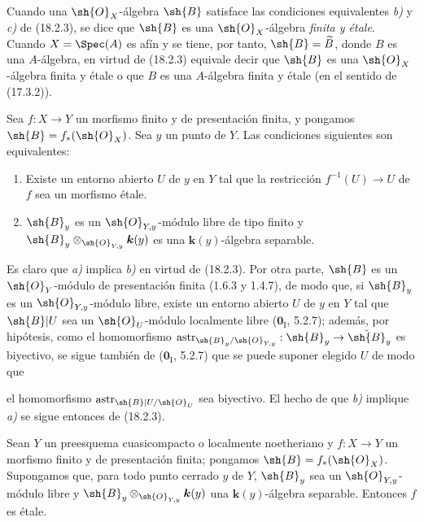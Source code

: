Cuando una $\sh{O}_X$-álgebra $\sh{B}$ satisface las condiciones equivalentes \emph{b)} y \emph{c)} de (18.2.3), se dice que $\sh{B}$ es una $\sh{O}_X$-álgebra \emph{finita y étale}. Cuando $X=\Spec(A)$ es afín y se tiene, por tanto, $\sh{B}=\widetilde B$, donde $B$ es una $A$-álgebra, en virtud de (18.2.3) equivale decir que $\sh{B}$ es una $\sh{O}_X$-álgebra finita y étale o que $B$ es una $A$-álgebra finita y étale (en el sentido de (17.3.2)).

\begin{corollary}[18.2.4]
\label{IV.18.2.4}
Sea $f:X\to Y$ un morfismo finito y de presentación finita, y pongamos $\sh{B}=f_*(\sh{O}_X)$. Sea $y$ un punto de $Y$. Las condiciones siguientes son equivalentes:
\begin{enumerate}
  \item[\textup{a)}] Existe un entorno abierto $U$ de $y$ en $Y$ tal que la restricción $f^{-1}(U)\to U$ de $f$ sea un morfismo étale.
  \item[\textup{b)}] $\sh{B}_y$ es un $\sh{O}_{Y,y}$-módulo libre de tipo finito y $\sh{B}_y\otimes_{\sh{O}_{Y,y}}\boldsymbol k(y)$ es una $\boldsymbol k(y)$-álgebra separable.
\end{enumerate}
\end{corollary}

Es claro que \emph{a)} implica \emph{b)} en virtud de (18.2.3). Por otra parte, $\sh{B}$ es un $\sh{O}_Y$-módulo de presentación finita (1.6.3 y 1.4.7), de modo que, si $\sh{B}_y$ es un $\sh{O}_{Y,y}$-módulo libre, existe un entorno abierto $U$ de $y$ en $Y$ tal que $\sh{B}|U$ sea un $\sh{O}_U$-módulo localmente libre ($\mathbf 0_{\mathrm I}$, 5.2.7); además, por hipótesis, como el homomorfismo $\operatorname{astr}_{\sh{B}_y/\sh{O}_{Y,y}}:\sh{B}_y\to\check{\sh{B}}_y$ es biyectivo, se sigue también de ($\mathbf 0_{\mathrm I}$, 5.2.7) que se puede suponer elegido $U$ de modo que


el homomorfismo $\operatorname{astr}_{\sh{B}|U/\sh{O}_U}$ sea biyectivo. El hecho de que \emph{b)} implique \emph{a)} se sigue entonces de (18.2.3).

\begin{corollary}[18.2.5]
\label{IV.18.2.5}
Sean $Y$ un preesquema cuasicompacto o localmente noetheriano y $f:X\to Y$ un morfismo finito y de presentación finita; pongamos $\sh{B}=f_*(\sh{O}_X)$. Supongamos que, para todo punto cerrado $y$ de $Y$, $\sh{B}_y$ sea un $\sh{O}_{Y,y}$-módulo libre y $\sh{B}_y\otimes_{\sh{O}_{Y,y}}\boldsymbol k(y)$ una $\boldsymbol k(y)$-álgebra separable. Entonces $f$ es étale.
\end{corollary}

